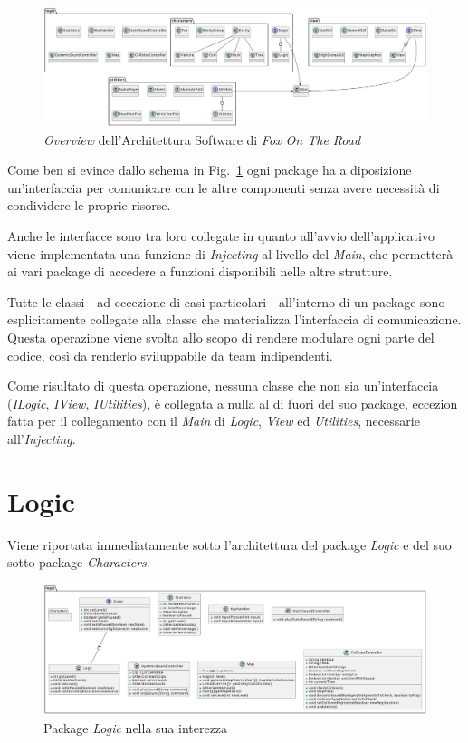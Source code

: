\documentclass[12pt,a4paper]{report}
\begin{document}
\begin{figure}[H]
	\centering
	\includegraphics[width=1\textwidth]{Generale.pdf}
	\caption{\emph{Overview} dell'Architettura Software di \emph{Fox On The Road}}
	\label{fig:GeneralUML}
\end{figure}

Come ben si evince dallo schema in Fig.~\ref{fig:GeneralUML} ogni package ha a diposizione un'interfaccia per comunicare con le altre componenti senza avere necessità di condividere le proprie risorse.

Anche le interfacce sono tra loro collegate in quanto all'avvio dell'applicativo viene implementata una funzione di \emph{Injecting} al livello del \emph{Main}, che permetterà ai vari package di accedere a funzioni disponibili nelle altre strutture.

Tutte le classi - ad eccezione di casi particolari - all'interno di un package sono esplicitamente collegate alla classe che materializza l'interfaccia di comunicazione. Questa operazione viene svolta allo scopo di rendere modulare ogni parte del codice, così da renderlo sviluppabile da team indipendenti.

Come risultato di questa operazione, nessuna classe che non sia un'interfaccia (\emph{ILogic}, \emph{IView}, \emph{IUtilities}), è collegata a nulla al di fuori del suo package, eccezion fatta per il collegamento con il \emph{Main} di \emph{Logic}, \emph{View} ed \emph{Utilities}, necessarie all'\emph{Injecting}.


\section{Logic}\label{se:arch.model}

Viene riportata immediatamente sotto l'architettura del package \emph{Logic} e del suo sotto-package \emph{Characters}.

\begin{figure}[H]
	\centering
	\includegraphics[width=1\textwidth]{LogicWithoutCharacters.pdf}
	\caption{Package \emph{Logic} nella sua interezza}
	\label{fig:Logic}
\end{figure}
\end{document}
